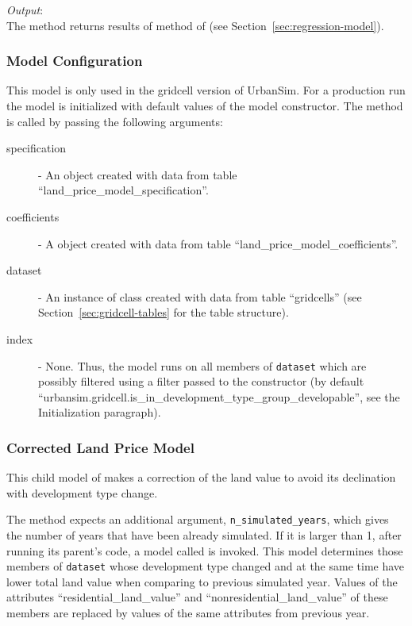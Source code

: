 {\it Output}:\\[1mm]
The method returns results of  method of
 (see Section~\ref{sec:regression-model}).

\subsubsection{Model Configuration}
%
This model is only used in the gridcell version of UrbanSim.
For a production run the model is
initialized with default values of the model 
constructor. The  method is called by passing the
following arguments:
\begin{description}
\item[specification] - An
 object created with data from table
``land_price_model_specification''. 
\item[coefficients] - A  object created
with data from table ``land_price_model_coefficients''.
\item[dataset] - An instance of class  created with data
  from table ``gridcells'' (see Section~\ref{sec:gridcell-tables} for the
  table structure).
\item[index] - None. Thus, the model runs on all members of \verb|dataset| which are possibly 
filtered using a filter passed to the constructor (by default ``urbansim.gridcell.is_in_development_type_group_developable'', see
the Initialization paragraph).
\end{description}

\subsubsection{Corrected Land Price Model}
%
This child model of   makes a
correction of the land value to avoid its declination with development type
change.

The  method expects an additional argument, \verb|n_simulated_years|,
which gives the number of years that have been already simulated. If it is larger than 1,
after running its parent's code, a model called  
is invoked. 
This model determines those members of \verb|dataset| whose
development type changed and at the same time have lower total land value when
comparing to previous simulated year. Values of the attributes 
``residential_land_value'' and ``nonresidential_land_value'' of these members
are replaced by values of the same attributes from previous year.

